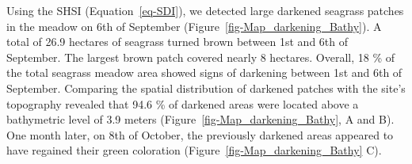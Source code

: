\documentclass[
  letterpaper,
  11pt,
  english,
  singlespacing,
  headsepline]{MastersDoctoralThesis}
\begin{document}
\begin{spacing}{1.5}
Using the SHSI (Equation~\ref{eq-SDI}), we detected large darkened
seagrass patches in the meadow on 6th of September
(Figure~\ref{fig-Map_darkening_Bathy}). A total of 26.9 hectares of
seagrass turned brown between 1st and 6th of September. The largest
brown patch covered nearly 8 hectares. Overall, 18 \% of the total
seagrass meadow area showed signs of darkening between 1st and 6th of
September. Comparing the spatial distribution of darkened patches with
the site's topography revealed that 94.6 \% of darkened areas were
located above a bathymetric level of 3.9 meters
(Figure~\ref{fig-Map_darkening_Bathy}, A and B). One month later, on 8th
of October, the previously darkened areas appeared to have regained
their green coloration (Figure~\ref{fig-Map_darkening_Bathy} C).

\begin{figure}

\end{figure}
\end{spacing}
\end{document}
